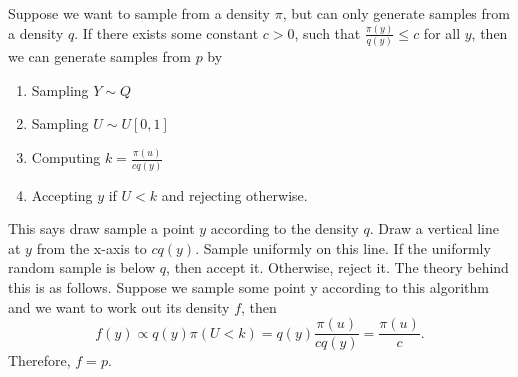 \documentclass[
]{book}
\theoremstyle{definition}
\theoremstyle{definition}
\theoremstyle{definition}
\theoremstyle{definition}
\theoremstyle{remark}
\begin{document}
Suppose we want to sample from a density \(\pi\), but can only generate samples from a density \(q\). If there exists some constant \(c > 0\), such that \(\frac{\pi(y)}{q(y)} \leq c\) for all \(y\), then we can generate samples from \(p\) by

\begin{enumerate}
\def\labelenumi{\arabic{enumi}.}
\item
  Sampling \(Y \sim Q\)
\item
  Sampling \(U \sim U[0, 1]\)
\item
  Computing \(k = \frac{\pi(u)}{cq(y)}\)
\item
  Accepting \(y\) if \(U < k\) and rejecting otherwise.
\end{enumerate}

This says draw sample a point \(y\) according to the density \(q\). Draw a vertical line at \(y\) from the x-axis to \(cq(y)\). Sample uniformly on this line. If the uniformly random sample is below \(q\), then accept it. Otherwise, reject it. The theory behind this is as follows. Suppose we sample some point y according to this algorithm and we want to work out its density \(f\), then
\[
f(y) \propto q(y)\pi(U < k) = q(y)\frac{\pi(u)}{cq(y)} = \frac{\pi(u)}{c}.
\]
Therefore, \(f = p\).
\end{document}
